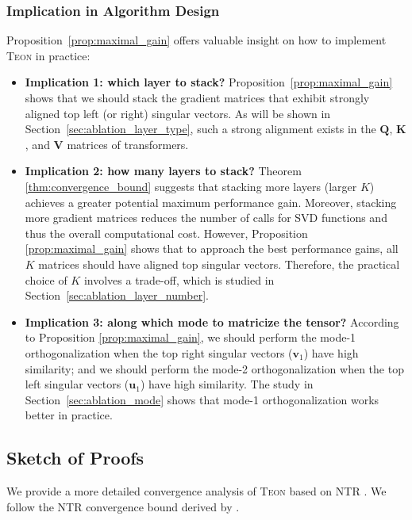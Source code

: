 \documentclass{article}
\newcommand{\mat}[1]{\mathbf{#1}}
\theoremstyle{plain}
\theoremstyle{definition}
\theoremstyle{remark}
\begin{document}
\subsubsection{Implication in Algorithm Design}
\label{sec:guidance}

Proposition~\ref{prop:maximal_gain} offers valuable insight on how to implement \textsc{Teon} in practice: 
\begin{itemize}
\vspace{-5pt}
    \item {\bf Implication 1: which layer to stack?} Proposition~\ref{prop:maximal_gain} shows that we should stack the gradient matrices that exhibit strongly aligned top left (or right) singular vectors. As will be shown in Section~\ref{sec:ablation_layer_type}, such a strong alignment exists in the $\mat{Q}$, $ \mat{K}$, and $\mat{V}$ matrices of transformers. 
    \vspace{-5pt}
    \item {\bf Implication 2: how many layers to stack?} Theorem \ref{thm:convergence_bound} suggests that stacking more layers (larger $K$) achieves a greater potential maximum performance gain.
Moreover, stacking more gradient matrices reduces the number of calls for SVD functions and thus the overall computational cost. However, Proposition \ref{prop:maximal_gain} shows that to approach the best performance gains, all $K$ matrices should have aligned top singular vectors. Therefore, the practical choice of $K$ involves a trade-off, which is studied in Section~\ref{sec:ablation_layer_number}.
\vspace{-5pt}
    \item {\bf Implication 3: along which mode to matricize the tensor?} According to Proposition \ref{prop:maximal_gain}, we should perform the mode-1 orthogonalization when the top right singular vectors ($\mathbf{v}_{1}$) have high similarity; and we should perform the mode-2 orthogonalization when the top left singular vectors ($\mathbf{u}_{1}$) have high similarity. The study in Section~\ref{sec:ablation_mode} shows that mode-1 orthogonalization works better in practice.
\end{itemize}

\subsection{Sketch of Proofs}
\label{subsec:proof}
We provide a more detailed convergence analysis of \textsc{Teon} based on NTR \cite{kovalev2025understanding}. We follow the NTR convergence bound derived by \cite{khaled2025muonbp}.
\end{document}
